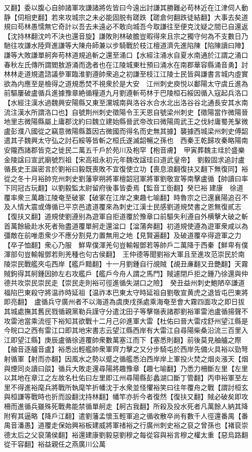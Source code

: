 又翻】委以腹心自帥諸軍攻謙諸將佐皆曰今遠出討謙其勝難必苟林近在江津伺人動静【伺相吏翻】若來攻城宗之未必能固脱有蹉跌【蹉倉何翻跌徒結翻】大事去矣道規曰苟林愚懦無它奇計以吾去未遠必不敢向城吾今取謙往至便克沈疑之間已自還返【沈持林翻沈吟不決也還音旋】謙敗則林破膽豈暇得來且宗之獨守何為不支數日乃馳往攻謙水陸齊進謙等大陳舟師兼以步騎戰於枝江檀道濟先進陷陳【陷陳讀曰陣】謙等大敗謙單舸奔苟林道規追斬之還至涌口【水經注涌水自夏水南通於江謂之涌口春秋左氏傳所謂閻敖游涌而逸者也在江陵城東杜預曰涌水在南郡華容縣涌音勇】討林林走道規遣諮議參軍臨淮劉遵帥衆追之初謙至枝江江陵士民皆與謙書言城内虛實欲為内應至是檢得之道規悉焚不視衆於是大安　江州刺史庾悦以鄱陽太守虞丘進為前驅屢破盧循兵進據豫章絶循糧道九月劉遵斬苟林于巴陵桓石綏因循入寇起兵洛口【水經注漢水過魏興安陽縣又東至灙城南與洛谷水合水北出洛谷谷北通長安其水南流注漢水所謂洛口也】自號荆州刺史徵陽令王天恩自號梁州刺史【徵陽當作微陽晉地里志微陽縣屬上庸郡沈約曰魏立建始縣晉武帝改曰微陽周武王之伐紂庸蜀羌髳微盧彭濮八國從之竊意微陽縣蓋因古微國而得名而史無其據】襲據西城梁州刺史傅韶遣其子魏興太守弘之討石綏等皆斬之桓氏遂滅韶暢之孫也　西秦王乾歸攻秦略陽南安隴西諸郡皆克之徙民二萬五千戶於苑川及枹罕【枹音膚】　甲寅葬魏主珪於盛樂金陵諡曰宣武廟號烈祖【宋高祖永初元年魏改諡珪曰道武皇帝】　劉毅固求追討盧循長史王誕密言於劉裕曰毅既喪敗不宜復使立功【喪息浪翻復扶又翻下無復同】裕從之冬十月裕帥兖州刺史劉藩寧朔將軍檀韶冠軍將軍劉敬宣等南擊盧循【帥讀曰率下同冠古玩翻】以劉毅監太尉留府後事皆委焉【監音工衘翻】癸巳裕建康　徐道覆率衆三萬趣江陵奄至破冢【破冢在江岸之東趣七喻翻】時魯宗之已還襄陽追召不及人情大震或傳循已平京邑遣道覆來為刺史江漢士民感劉道規焚書之恩無復貳志【復扶又翻】道規使劉遵别為遊軍自拒道覆於豫章口前驅失利遵自外横擊大破之斬首萬餘級赴水死者殆盡道覆單舸走還湓口【湓蒲奔翻】初道規使遵為遊軍衆咸以為彊敵在前唯患衆少不應分割見力置無用之地【見賢遍翻】及破道覆卒得遊軍之力【卒子恤翻】衆心乃服　鮮卑僕渾羌句豈輸報鄧若等帥戶二萬降于西秦【鮮卑有僕渾部句豈輸報鄧若則羌種也句古侯翻】　王仲德等聞劉裕大軍且至進攻范崇民於南陵崇民戰艦夾屯西岸【艦戶黯翻】十一月劉鍾自行覘賊【覘丑亷翻又丑艷翻】天霧賊鉤得其舸鍾因帥左右攻艦戶【艦戶今舟人謂之馬門】賊遽閉戶拒之鍾乃徐還與仲德共攻崇民崇民走【崇民走則裕可徑進循失湖口之險】　癸丑益州刺史鮑陋卒謙道福陷巴東殺守將温祚時延祖【温祚本巴東太守時延祖自劉敬宣黄虎之退皆屯巴東將即亮翻】　盧循兵守廣州者不以海道為虞庚戌孫處乘海奄至會大霧四面攻之即日拔其城處撫其舊民戮循親黨勒兵謹守分遣沈田子等擊嶺表諸郡劉裕軍雷池盧循揚聲不攻雷池當乘流徑下裕知其欲戰十二月己卯進軍大雷【杜佑曰晉大雷戍舒州望江縣是今晥口之西有雷江口即其地宋書志云望江縣西岸有大雷江自尋陽柴桑沿流三百里入江即望江縣】庚辰盧循徐道覆帥衆數萬塞江而下【塞悉則翻】前後莫見舳艫之際【舳音逐艫音盧】裕悉出輕艦帥衆軍齊力擊之又分步騎屯於西岸先備火具裕以勁弩射循軍【射而亦翻】因風水之勢以蹙之循艦悉泊西岸岸上軍投火焚之烟炎漲天【烟與煙同炎讀曰燄】循兵大敗走還尋陽將趣豫章【趣七喻翻】乃悉力柵斷左里【左里以其地在章江之左故名杜佑曰左里即江州尋陽縣彭蠡湖口斷丁管翻】丙申裕軍至左里不得進裕麾兵將戰所執麾竿折幡沈于水衆並怪懼裕笑曰往年覆舟之戰【謂討桓玄與桓謙等戰時也折而設翻沈持林翻】幡竿亦折今者復然【復扶又翻】賊必破矣即攻柵而進循兵雖殊死戰弗能禁循單舸走【舸古我翻】所殺及投水死者凡萬餘人納其降附宥其逼略【降戶江翻】遣劉藩孟懷玉輕軍追之循收散卒尚有數千人徑還番禺【番禺音潘愚】道覆走保始興裕板建威將軍禇裕之行廣州刺史裕之裒之曾孫也【褚裒崇德太后之父裒蒲侯翻】裕還建康劉毅惡劉穆之每從容與裕言穆之權太重【惡烏路翻從干容翻】裕益親任之燕廣川公萬